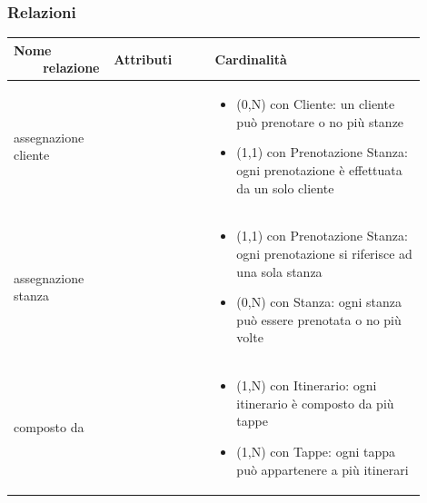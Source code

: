 \documentclass[12pt,a4paper]{article}
\begin{document}
\subsubsection{Relazioni}
\label{Soggiono Relazioni}
\begin{center}

\setlength{\extrarowheight}{1.5pt}

\begin{longtable}{|p{0.16\linewidth}|p{0.24\linewidth}|p{0.50\linewidth}|}
\hline 
\textbf{Nome \ \ \ \ relazione} 	& \textbf{Attributi} & \textbf{Cardinalità}\\ 

    
\hline
assegnazione cliente 				& \begin{flushleft}\vspace{-25pt} \end{flushleft}
					& \begin{itemize}
						\setlength{\itemindent}{-1em}
						\vspace{-25pt}
						\setlength\itemsep{-0.25em}
						\item (0,N) con Cliente: un cliente può prenotare o no più stanze
						\item (1,1) con Prenotazione Stanza: ogni prenotazione è effettuata da un solo cliente
					\end{itemize}\\ 

\hline
assegnazione stanza 				& \begin{flushleft}\vspace{-25pt}  \end{flushleft}
					& \begin{itemize}
						\setlength{\itemindent}{-1em}
						\vspace{-25pt}
						\setlength\itemsep{-0.25em}
						\item (1,1) con Prenotazione Stanza: ogni prenotazione si riferisce ad una sola stanza
						\item (0,N) con Stanza: ogni stanza può essere prenotata o no più volte
					\end{itemize}\\ 

\hline
composto da 				& \begin{flushleft}\vspace{-15pt}  \end{flushleft}
					& \begin{itemize}
						\setlength{\itemindent}{-1em}
						\vspace{-25pt}
						\setlength\itemsep{-0.25em}
						\item (1,N) con Itinerario: ogni itinerario è composto da più tappe
						\item (1,N) con Tappe: ogni tappa può appartenere a più itinerari
					\end{itemize}\\ 


\end{longtable}
\end{center}
\end{document}

